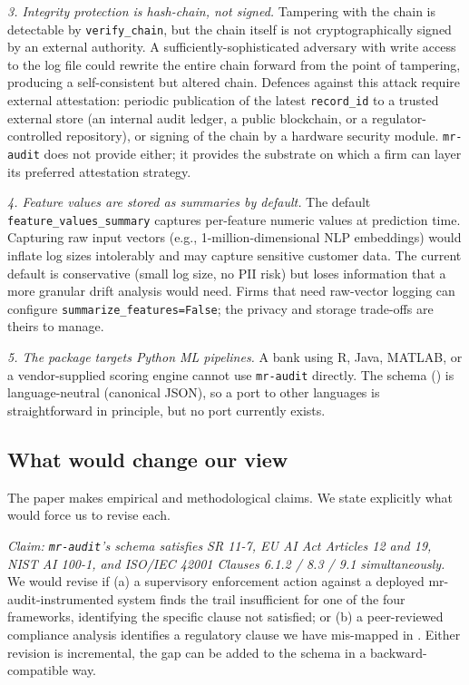 \textit{3. Integrity protection is hash-chain, not signed.} Tampering with the chain is detectable by \texttt{verify\_chain}, but the chain itself is not cryptographically signed by an external authority. A sufficiently-sophisticated adversary with write access to the log file could rewrite the entire chain forward from the point of tampering, producing a self-consistent but altered chain. Defences against this attack require external attestation: periodic publication of the latest \texttt{record\_id} to a trusted external store (an internal audit ledger, a public blockchain, or a regulator-controlled repository), or signing of the chain by a hardware security module. \texttt{mr-audit} does not provide either; it provides the substrate on which a firm can layer its preferred attestation strategy.

\textit{4. Feature values are stored as summaries by default.} The default \texttt{feature\_values\_summary} captures per-feature numeric values at prediction time. Capturing raw input vectors (e.g., 1-million-dimensional NLP embeddings) would inflate log sizes intolerably and may capture sensitive customer data. The current default is conservative (small log size, no PII risk) but loses information that a more granular drift analysis would need. Firms that need raw-vector logging can configure \texttt{summarize\_features=False}; the privacy and storage trade-offs are theirs to manage.

\textit{5. The package targets Python ML pipelines.} A bank using R, Java, MATLAB, or a vendor-supplied scoring engine cannot use \texttt{mr-audit} directly. The schema () is language-neutral (canonical JSON), so a port to other languages is straightforward in principle, but no port currently exists.

\subsection{What would change our view}\label{sec:falsification}

The paper makes empirical and methodological claims. We state explicitly what would force us to revise each.

\textit{Claim: \texttt{mr-audit}'s schema satisfies SR 11-7, EU AI Act Articles 12 and 19, NIST AI 100-1, and ISO/IEC 42001 Clauses 6.1.2 / 8.3 / 9.1 simultaneously.} We would revise if (a) a supervisory enforcement action against a deployed mr-audit-instrumented system finds the trail insufficient for one of the four frameworks, identifying the specific clause not satisfied; or (b) a peer-reviewed compliance analysis identifies a regulatory clause we have mis-mapped in . Either revision is incremental, the gap can be added to the schema in a backward-compatible way.

